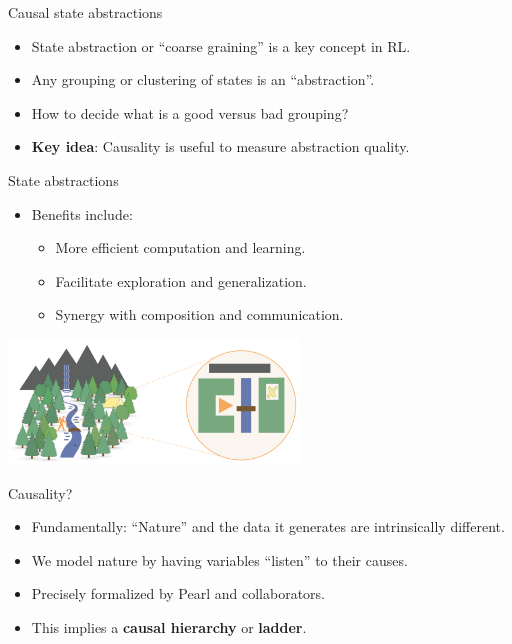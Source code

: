 \begin{frame}{Causal state abstractions}
    \begin{itemize}
        \item State abstraction or \enquote{coarse graining} is a key concept in RL.
        \item Any grouping or clustering of states is an \enquote{abstraction}.
        \item How to decide what is a good versus bad grouping?
        \bigskip
        \item \textbf{Key idea}: Causality is useful to measure abstraction quality.
    \end{itemize}

\end{frame}

\begin{frame}{State abstractions}
\begin{itemize}
    \item Benefits include:
    \begin{itemize}
        \item More efficient computation and learning.
        \item Facilitate exploration and generalization.
        \item Synergy with composition and communication.
    \end{itemize}
\end{itemize}
    \includegraphics[width=0.58\textwidth]{images/valueofabstraction.png}
\end{frame}


\begin{frame}{Causality?}
    \begin{itemize}
        \item Fundamentally: \enquote{Nature} and the data it generates are intrinsically different.
        \item We model nature by having variables \enquote{listen} to their causes.
        \item Precisely formalized by Pearl and collaborators.
        \bigskip
        \item This implies a \textbf{causal hierarchy} or \textbf{ladder}.
    \end{itemize}
    
\end{frame}

